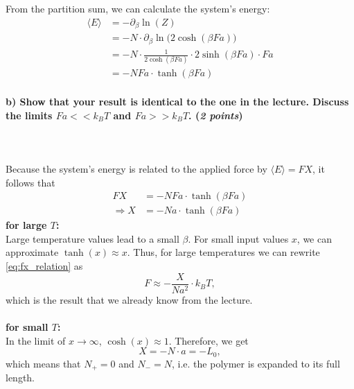     \noindent
    From the partition sum, we can calculate the system's energy:
    \begin{align}
        \langle E\rangle
        &=-\partial_\beta \ln(Z) \\
        &=-N\cdot\partial_\beta\ln\bigg(2\cosh(\beta Fa)\bigg) \\
        &=-N\cdot\frac{1}{2\cosh(\beta Fa)}\cdot 2\sinh(\beta Fa)\cdot Fa \\
        &=-NFa\cdot\tanh(\beta Fa)
    \end{align}

\newpage
\paragraph{b) Show that your result is identical to the one in the lecture.
    Discuss the limits $Fa<<k_BT$ and $Fa>>k_BT$. (\textit{2 points})
} \ \\
    \\
    Because the system's energy is related to the applied force by 
    $\langle E\rangle=FX$, it follows that 
    \begin{align}
        FX
        &=-NFa\cdot\tanh(\beta Fa) \\
        \Rightarrow X
        &=-Na\cdot\tanh(\beta Fa)
        \label{eq:fx_relation}
    \end{align}
    \textbf{for large $T$:} \\
    Large temperature values lead to a small $\beta$.
    For small input values $x$, we can approximate $\tanh(x)\approx x$.
    Thus, for large temperatures we can rewrite \autoref{eq:fx_relation} as
    \begin{equation}
        F\approx-\frac{X}{Na^2}\cdot k_BT,
    \end{equation}
    which is the result that we already know from the lecture. \\
    \\
    \textbf{for small $T$:} \\
    In the limit of $x\to\infty$, $\cosh(x)\approx1$. Therefore, we get 
    \begin{equation}
        X=-N\cdot a=-L_0,
    \end{equation}
    which means that $N_+=0$ and $N_-=N$, i.e. the polymer is expanded to its 
    full length.

